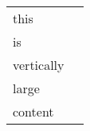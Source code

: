  
  \ea
    \parbox[t]{.8\textwidth}{
      \vspace{-.7\baselineskip}
      \begin{tabular}{ll}
	this \\
	is \\
	vertically\\
	large\\
	content
      \end{tabular}
     }
  \z 